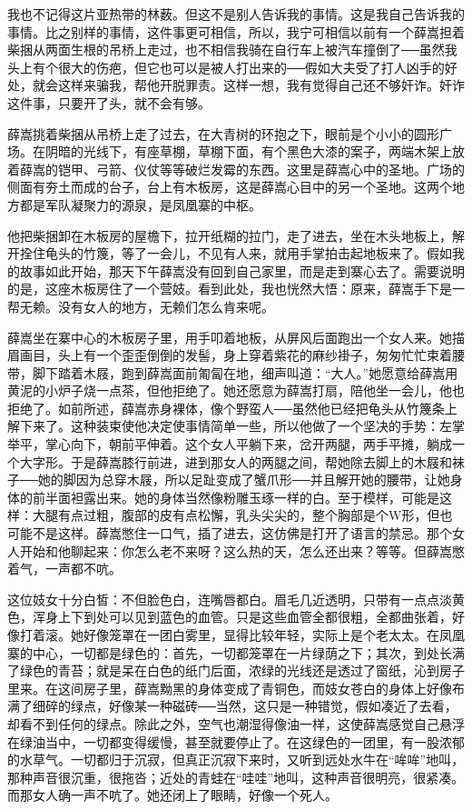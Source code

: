 我也不记得这片亚热带的林薮。但这不是别人告诉我的事情。这是我自己告诉我的事情。比之别样的事情，这件事更可相信，所以，我宁可相信以前有一个薛嵩担着柴捆从两面生根的吊桥上走过，也不相信我骑在自行车上被汽车撞倒了──虽然我头上有个很大的伤疤，但它也可以是被人打出来的──假如大夫受了打人凶手的好处，就会这样来骗我，帮他开脱罪责。这样一想，我有觉得自己还不够奸诈。奸诈这件事，只要开了头，就不会有够。 

薛嵩挑着柴捆从吊桥上走了过去，在大青树的环抱之下，眼前是个小小的圆形广场。在阴暗的光线下，有座草棚，草棚下面，有个黑色大漆的案子，两端木架上放着薛嵩的铠甲、弓箭、仪仗等等破烂发霉的东西。这里是薛嵩心中的圣地。广场的侧面有夯土而成的台子，台上有木板房，这是薛嵩心目中的另一个圣地。这两个地方都是军队凝聚力的源泉，是凤凰寨的中枢。 

他把柴捆卸在木板房的屋檐下，拉开纸糊的拉门，走了进去，坐在木头地板上，解开拴住龟头的竹篾，等了一会儿，不见有人来，就用手掌拍击起地板来了。假如我的故事如此开始，那天下午薛嵩没有回到自己家里，而是走到寨心去了。需要说明的是，这座木板房住了一个营妓。看到此处，我也恍然大悟：原来，薛嵩手下是一帮无赖。没有女人的地方，无赖们怎么肯来呢。 

薛嵩坐在寨中心的木板房子里，用手叩着地板，从屏风后面跑出一个女人来。她描眉画目，头上有一个歪歪倒倒的发髻，身上穿着紫花的麻纱褂子，匆匆忙忙束着腰带，脚下踏着木屐，跑到薛嵩面前匍匐在地，细声叫道：“大人。”她愿意给薛嵩用黄泥的小炉子烧一点茶，但他拒绝了。她还愿意为薛嵩打扇，陪他坐一会儿，他也拒绝了。如前所述，薛嵩赤身裸体，像个野蛮人──虽然他已经把龟头从竹篾条上解下来了。这种装束使他决定使事情简单一些，所以他做了一个坚决的手势：左掌举平，掌心向下，朝前平伸着。这个女人平躺下来，岔开两腿，两手平摊，躺成一个大字形。于是薛嵩膝行前进，进到那女人的两腿之间，帮她除去脚上的木屐和袜子──她的脚因为总穿木屐，所以足趾变成了蟹爪形──并且解开她的腰带，让她身体的前半面袒露出来。她的身体当然像粉雕玉琢一样的白。至于模样，可能是这样：大腿有点过粗，腹部的皮有点松懈，乳头尖尖的，整个胸部是个W形，但也可能不是这样。薛嵩憋住一口气，插了进去，这仿佛是打开了语言的禁忌。那个女人开始和他聊起来：你怎么老不来呀？这么热的天，怎么还出来？等等。但薛嵩憋着气，一声都不吭。 

这位妓女十分白皙：不但脸色白，连嘴唇都白。眉毛几近透明，只带有一点点淡黄色，浑身上下到处可以见到蓝色的血管。只是这些血管全都很粗，全都曲张着，好像打着滚。她好像笼罩在一团白雾里，显得比较年轻，实际上是个老太太。在凤凰寨的中心，一切都是绿色的：首先，一切都笼罩在一片绿荫之下；其次，到处长满了绿色的青苔；就是呆在白色的纸门后面，浓绿的光线还是透过了窗纸，沁到房子里来。在这间房子里，薛嵩黝黑的身体变成了青铜色，而妓女苍白的身体上好像布满了细碎的绿点，好像某一种磁砖──当然，这只是一种错觉，假如凑近了去看，却看不到任何的绿点。除此之外，空气也潮湿得像油一样，这使薛嵩感觉自己悬浮在绿油当中，一切都变得缓慢，甚至就要停止了。在这绿色的一团里，有一股浓郁的水草气。一切都归于沉寂，但真正沉寂下来时，又听到远处水牛在“哞哞”地叫，那种声音很沉重，很拖沓；近处的青蛙在“哇哇”地叫，这种声音很明亮，很紧凑。而那女人确一声不吭了。她还闭上了眼睛，好像一个死人。 

